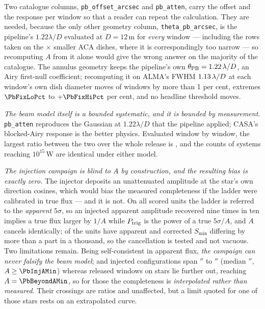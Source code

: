 Two catalogue columns, \texttt{pb\_offset\_arcsec} and \texttt{pb\_atten},
carry the offset and the response per window so that a reader can repeat the
calculation. They are needed, because the only other geometry column,
\texttt{theta\_pb\_arcsec}, is the pipeline's $1.22\lambda/D$ evaluated at
$D=12$\,m for \emph{every} window --- including the \PbNAcaRow{} rows taken
on the \PbAcaRatio$\times$ smaller ACA dishes, where it is correspondingly
too narrow --- so recomputing $A$ from it alone would give the wrong answer
on the majority of the catalogue. The annulus geometry keeps the pipeline's
own $\theta_{\rm PB}=1.22\,\lambda/D$, an Airy first-null
coefficient; recomputing it on ALMA's FWHM $1.13\,\lambda/D$ at each
window's own dish diameter moves \NPbFixOnePct{} of \NWindows{} windows by
more than 1 per cent, extremes $\PbFixLoPct$ to $+\PbFixHiPct$ per cent, and
no headline threshold moves.

\emph{The beam model itself is a bounded systematic, and it is bounded by
measurement.} \texttt{pb\_atten} reproduces the Gaussian at $1.22\lambda/D$
that the pipeline applied; CASA's blocked-Airy response is the better
physics. Evaluated window by window, the largest ratio between the two over
the whole release is \PbModelMax, and the counts of systems reaching
$10^{15}$\,W are identical under either model.

\emph{The injection campaign is blind to $A$ by construction, and the
resulting bias is exactly zero.} The injector deposits an unattenuated
amplitude at the star's own direction cosines, which would bias the measured
completeness if the ladder were calibrated in true flux --- and it is not. On
all \PbInjNUnit{} scored units the ladder is referred to the \emph{apparent}
$5\sigma$, so an injected apparent amplitude recovered nine times in ten
implies a true flux larger by $1/A$ while $P_{\rm trig}$ is the power of a
true $5\sigma/A$, and $A$ cancels identically; \PbInjNDistinct{} of the
\PbInjNUnit{} units have apparent and corrected $S_{\min}$ differing by more
than a part in a thousand, so the cancellation is tested and not vacuous. Two
limitations remain. Being self-consistent in apparent flux, \emph{the
campaign can never falsify the beam model}; and injected configurations span
\PbInjOffMin$''$ to \PbInjOffMax$''$ (median \PbInjOffMed$''$,
$A\ge\PbInjAMin$) whereas \PbNBeyond{} released windows on \PbNBeyondStar{}
stars lie further out, reaching $A=\PbBeyondAMin$, so for those the
completeness is \emph{interpolated rather than measured}. Their
\PbNBeyondCross{} crossings are ratios and unaffected, but a limit quoted for
one of those stars rests on an extrapolated curve.

